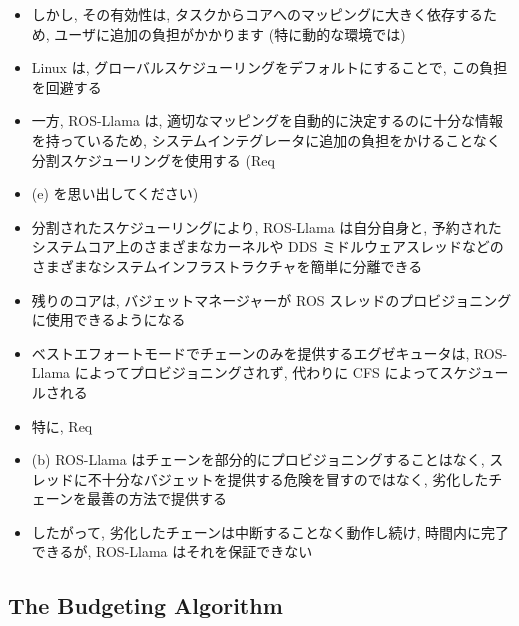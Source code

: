 \begin{frame}{}
    \begin{itemize}
        \item しかし, その有効性は, タスクからコアへのマッピングに大きく依存するため, ユーザに追加の負担がかかります (特に動的な環境では)
        \item Linux は, グローバルスケジューリングをデフォルトにすることで, この負担を回避する
        \item 一方, ROS-Llama は, 適切なマッピングを自動的に決定するのに十分な情報を持っているため, システムインテグレータに追加の負担をかけることなく分割スケジューリングを使用する (Req
        \item (e) を思い出してください)
    \end{itemize}
\end{frame}

\begin{frame}{}
    \begin{itemize}
        \item 分割されたスケジューリングにより, ROS-Llama は自分自身と, 予約されたシステムコア上のさまざまなカーネルや DDS ミドルウェアスレッドなどのさまざまなシステムインフラストラクチャを簡単に分離できる
        \item 残りのコアは, バジェットマネージャーが ROS スレッドのプロビジョニングに使用できるようになる
    \end{itemize}
\end{frame}

\begin{frame}{}
    \begin{itemize}
        \item ベストエフォートモードでチェーンのみを提供するエグゼキュータは, ROS-Llama によってプロビジョニングされず, 代わりに CFS によってスケジュールされる
        \item 特に, Req
        \item (b) ROS-Llama はチェーンを部分的にプロビジョニングすることはなく, スレッドに不十分なバジェットを提供する危険を冒すのではなく, 劣化したチェーンを最善の方法で提供する
        \item したがって, 劣化したチェーンは中断することなく動作し続け, 時間内に完了できるが, ROS-Llama はそれを保証できない
    \end{itemize}
\end{frame}


\subsection{The Budgeting Algorithm}
\label{ssec: the budgeting algorithm}

